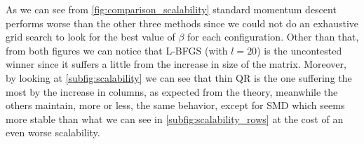 \noindent As we can see from \autoref{fig:comparison_scalability} standard momentum descent performs worse than the other three methods since we could not do an exhaustive grid search to look for the best value of $\beta$ for each configuration. Other than that, from both figures we can notice that L-BFGS (with $l=20$) is the uncontested winner since it suffers a little from the increase in size of the matrix. Moreover, by looking at \autoref{subfig:scalability} we can see that thin QR is the one suffering the most by the increase in columns, as expected from the theory, meanwhile the others maintain, more or less, the same behavior, except for SMD which seems more stable than what we can see in \autoref{subfig:scalability_rows} at the cost of an even worse scalability.
